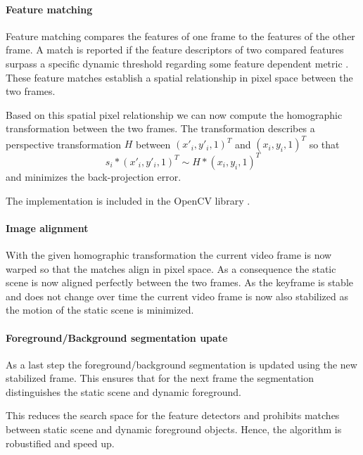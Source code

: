 \paragraph{Feature matching}
Feature matching compares the features of one frame to the features of the other frame.
A match is reported if the feature descriptors of two compared features surpass a specific dynamic
threshold \cite{lowe10.1023/B:VISI.0000029664.99615.94} regarding some feature
dependent metric \cite{kumar2014survey}.
These feature matches establish a spatial relationship in pixel space between
the two frames.

Based on this spatial pixel relationship we can now compute the homographic
transformation between the two frames. The transformation describes a
perspective transformation $H$ between $(x'_i, y'_i, 1)^T$ and
$(x_i, y_i, 1)^T$ so that
\begin{equation}
 s_i  * (x'_i, y'_i, 1)^T \sim H * (x_i, y_i, 1)^T
\end{equation}
and minimizes the back-projection error.

The implementation is included in the OpenCV library \cite{opencv_library}.

\paragraph{Image alignment}
With the given homographic transformation the current video frame is now warped so that the matches align in pixel space.
As a consequence the static scene is now aligned perfectly between the two frames. 
As the keyframe is stable and does not change over time the current video frame
is now also stabilized as the motion of the static scene is minimized.

\paragraph{Foreground/Background segmentation upate}
As a last step the foreground/background segmentation is updated using the new
stabilized frame. This ensures that for the next frame the segmentation
distinguishes the static scene and dynamic foreground. 

This reduces the search space for the feature detectors and prohibits matches
between static scene and dynamic foreground objects. Hence, the algorithm is
robustified and speed up.
